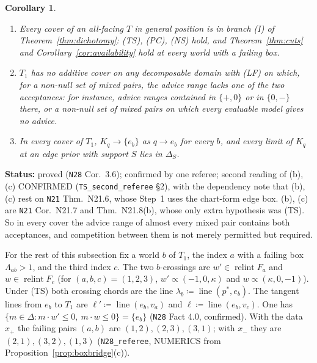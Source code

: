 \documentclass[11pt]{article}
\newtheorem{corollary}[theorem]{Corollary}
\theoremstyle{definition}
\theoremstyle{remark}
\newcommand{\relint}{\operatorname{relint}}
\newcommand{\lin}{\operatorname{line}}
\newcommand{\src}[1]{\texttt{#1}}
\newcommand{\status}[1]{\par\smallskip\noindent\textbf{Status:} #1\par\smallskip}
\begin{document}
\begin{corollary}\label{cor:TSalways}
\begin{enumerate}[leftmargin=*,label=(\alph*)]
\item Every cover of an all-facing $T$ in general position is in branch (I) of Theorem~\ref{thm:dichotomy}: (TS), (PC), (NS) hold, and Theorem~\ref{thm:cuts} and Corollary~\ref{cor:availability} hold at every world with a failing box.
\item $T_1$ has no additive cover on any decomposable domain with (LF) on which, for a non-null set of mixed pairs, the advice range lacks one of the two acceptances: for instance, advice ranges contained in $\{+,0\}$ or in $\{0,-\}$ there, or a non-null set of mixed pairs on which every evaluable model gives no advice.
\item In every cover of $T_1$, $K_q\to\{e_b\}$ as $q\to e_b$ for every $b$, and every limit of $K_q$ at an edge prior with support $S$ lies in $\Delta_S$.
\end{enumerate}
\end{corollary}
\status{proved (\src{N28} Cor.~3.6); confirmed by one referee; second reading of (b), (c) CONFIRMED (\src{TS\_second\_referee} \S2), with the dependency note that (b), (c) rest on \src{N21} Thm.~N21.6, whose Step~1 uses the chart-form edge box. (b), (c) are \src{N21} Cor.~N21.7 and Thm.~N21.8(b), whose only extra hypothesis was (TS). So in every cover the advice range of almost every mixed pair contains both acceptances, and competition between them is not merely permitted but required.}

For the rest of this subsection fix a world $b$ of $T_1$, the index $a$ with a failing box $\Lambda_{ab}>1$, and the third index $c$. The two $b$-crossings are $w'\in\relint F_a$ and $w\in\relint F_c$ (for $(a,b,c)=(1,2,3)$, $w'\propto(-1,0,\kappa)$ and $w\propto(\kappa,0,-1)$). Under (TS) both crossing chords are the line $\lambda_b\coloneqq\lin(p^*,e_b)$. The tangent lines from $e_b$ to $T_1$ are $\ell'\coloneqq\lin(e_b,v_a)$ and $\ell\coloneqq\lin(e_b,v_c)$. One has $\{m\in\Delta:m\cdot w'\le0,\ m\cdot w\le0\}=\{e_b\}$ (\src{N28} Fact 4.0, confirmed). With the data $x_+$ the failing pairs $(a,b)$ are $(1,2),(2,3),(3,1)$; with $x_-$ they are $(2,1),(3,2),(1,3)$ (\src{N28\_referee}, NUMERICS from Proposition~\ref{prop:boxbridge}(c)).
\end{document}
